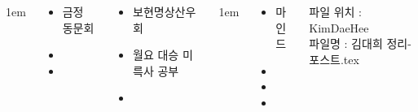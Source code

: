 \documentclass[	20pt, 
							a0paper, 
							landscape,
							margin=0mm, %
							innermargin=10mm,  		%
							blockverticalspace=4mm, %
							colspace=5mm, 
							subcolspace=0mm
							]{tikzposter}
\begin{document}
\begin{columns}
			{
					\setlength{\leftmargini}{4em}
					\setlength{\labelsep} {1em}
				\begin{LARGE}
					\begin{itemize}
					\item 금정 동문회
					\item 
					\item 
					\end{itemize}
				\end{LARGE}
			} %


			{
				\begin{LARGE}
					\begin{itemize}
					\item 보현명상산우회
					\item 월요 대승 미륵사 공부 
					\item 
					\end{itemize}
				\end{LARGE}
			} %




			{
					\setlength{\leftmargini}{3em}
					\setlength{\labelsep} {1em}
				\begin{LARGE}
					\begin{itemize}
					\item 마인드 
					\item 
					\item 
					\item 
					\end{itemize}
				\end{LARGE}
파일 위치 : KimDaeHee\\
파일명 : 김대희 정리-포스트.tex
			} %






	\end{columns}
\end{document}
